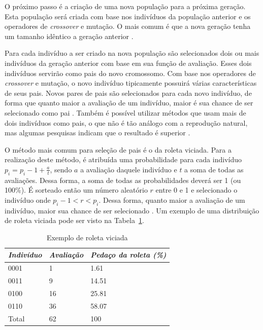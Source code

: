\documentclass[12pt,oneside,a4paper,english,french,spanish,brazil,]{abntex2}
\begin{document}
O próximo passo é a criação de uma nova população para a próxima geração. Esta população será criada com base nos indivíduos da população anterior e os operadores de \textit{crossover} e mutação. O mais comum é que a nova geração tenha um tamanho idêntico a geração anterior \cite{linden:2008}.

Para cada indivíduo a ser criado na nova população são selecionados dois ou mais indivíduos da geração anterior com base em sua função de avaliação. Esses dois indivíduos servirão como pais do novo cromossomo. Com base nos operadores de \textit{crossover} e mutação, o novo indivíduo tipicamente possuirá várias características de seus pais. Novos pares de pais são selecionados para cada novo indivíduo, de forma que quanto maior a avaliação de um indivíduo, maior é sua chance de ser selecionado como pai \cite{linden:2008}. Também é possível utilizar métodos que usam mais de dois indivíduos como pais, o que não é tão análogo com a reprodução natural, mas algumas pesquisas indicam que o resultado é superior \cite{ting:2005} \cite{eiben:1994}.

O método mais comum para seleção de pais é o da roleta viciada. Para a realização deste método, é atribuída uma probabilidade para cada indivíduo \(p_i = p_i-1 + \frac{a}{t}\), sendo \(a\) a avaliação daquele indivíduo e \(t\) a soma de todas as avaliações. Dessa forma, a soma de todas as probabilidades deverá ser 1 (ou 100\%). É sorteado então um número aleatório \(r\) entre 0 e 1 e selecionado o indivíduo onde \(p_i-1 < r < p_i\). Dessa forma, quanto maior a avaliação de um indivíduo, maior sua chance de ser selecionado \cite{linden:2008}. Um exemplo de uma distribuição de roleta viciada pode ser visto na Tabela~\ref{tab:Roleta}.

\begin{table}
\centering
\caption{Exemplo de roleta viciada}
\label{tab:Roleta}
\begin{tabular}{lll}
\hline
\textit{\textbf{Indivíduo}} & \textit{\textbf{Avaliação}} & \textit{\textbf{Pedaço da roleta (\%)}} \\ \hline
0001      & 1         & 1.61                  \\
0011      & 9         & 14.51                 \\ 
0100      & 16        & 25.81                 \\ 
0110      & 36        & 58.07                 \\ 
Total     & 62        & 100                   \\ \hline
\end{tabular}
\end{table}
\end{document}
